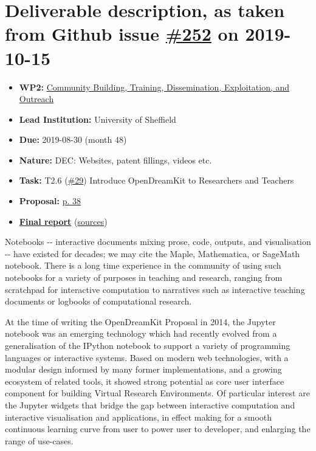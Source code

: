 \hypertarget{deliverable-description-as-taken-from-github-issue-252-on-2019-10-15}{%
\section*{\texorpdfstring{Deliverable description, as taken from Github
issue
\href{https://github.com/OpenDreamKit/OpenDreamKit/issues/252}{\#252} on
2019-10-15}{Deliverable description, as taken from Github issue \#252 on 2019-10-15}}\label{deliverable-description-as-taken-from-github-issue-252-on-2019-10-15}}

\begin{itemize}
\tightlist
\item
  \textbf{WP2:}
  \href{https://github.com/OpenDreamKit/OpenDreamKit/tree/master/WP2}{Community
  Building, Training, Dissemination, Exploitation, and Outreach}
\item
  \textbf{Lead Institution:} University of Sheffield
\item
  \textbf{Due:} 2019-08-30 (month 48)
\item
  \textbf{Nature:} DEC: Websites, patent fillings, videos etc.
\item
  \textbf{Task:} T2.6
  (\href{https://github.com/OpenDreamKit/OpenDreamKit/issues/29}{\#29})
  Introduce OpenDreamKit to Researchers and Teachers
\item
  \textbf{Proposal:}
  \href{https://github.com/OpenDreamKit/OpenDreamKit/raw/master/Proposal/proposal-www.pdf}{p.
  38}
\item
  \textbf{\href{https://github.com/OpenDreamKit/OpenDreamKit/raw/master/WP2/D2.17/report-final.pdf}{Final
  report}}
  (\href{https://github.com/OpenDreamKit/OpenDreamKit/raw/master/WP2/D2.17/}{sources})
\end{itemize}

Notebooks -\/- interactive documents mixing prose, code, outputs, and
visualisation -\/- have existed for decades; we may cite the Maple,
Mathematica, or SageMath notebook. There is a long time experience in
the community of using such notebooks for a variety of purposes in
teaching and research, ranging from scratchpad for interactive
computation to narratives such as interactive teaching documents or
logbooks of computational research.

At the time of writing the OpenDreamKit Proposal in 2014, the Jupyter
notebook was an emerging technology which had recently evolved from a
generalisation of the IPython notebook to support a variety of
programming languages or interactive systems. Based on modern web
technologies, with a modular design informed by many former
implementations, and a growing ecosystem of related tools, it showed
strong potential as core user interface component for building Virtual
Research Environments. Of particular interest are the Jupyter widgets
that bridge the gap between interactive computation and interactive
visualisation and applications, in effect making for a smooth continuous
learning curve from user to power user to developer, and enlarging the
range of use-cases.

